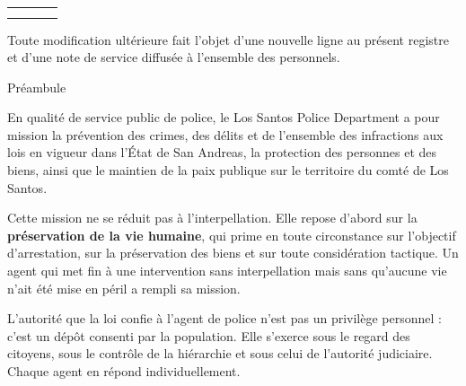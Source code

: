 \lspdornament


\noindent
\begin{tabular}{P{24mm} P{26mm} P{34mm} P{60mm}}
\headrow
{} &  &  &  \\
 & \tcell{\textbf{\DATEVIGUEUR}} &  &  \\
\bottomrule
\end{tabular}

\vspace{4pt}
{\lspdsans\fontsize{8}{10}\selectfont\color{lspdgrey}
Toute modification ultérieure fait l'objet d'une nouvelle ligne au présent registre et d'une note de service diffusée à l'ensemble des personnels.}

\clearpage

{\lspddisp\fontsize{22}{26}\selectfont\color{lspdnavy}Préambule}\\[4pt]
\lspdrulewide\vspace{3pt}
\noindent{}
\vspace{13pt}

\justifying
En qualité de service public de police, le Los Santos Police Department a pour mission la prévention des crimes, des délits et de l'ensemble des infractions aux lois en vigueur dans l'État de San Andreas, la protection des personnes et des biens, ainsi que le maintien de la paix publique sur le territoire du comté de Los Santos.

\vspace{7pt}
Cette mission ne se réduit pas à l'interpellation. Elle repose d'abord sur la \textbf{préservation de la vie humaine}, qui prime en toute circonstance sur l'objectif d'arrestation, sur la préservation des biens et sur toute considération tactique. Un agent qui met fin à une intervention sans interpellation mais sans qu'aucune vie n'ait été mise en péril a rempli sa mission.

\vspace{7pt}
L'autorité que la loi confie à l'agent de police n'est pas un privilège personnel : c'est un dépôt consenti par la population. Elle s'exerce sous le regard des citoyens, sous le contrôle de la hiérarchie et sous celui de l'autorité judiciaire. Chaque agent en répond individuellement.

